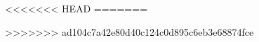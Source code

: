 \documentclass[laboratorio]{guia}
\begin{document}
<<<<<<< HEAD
=======




>>>>>>> ad104c7a42e80d40c124c0d895c6eb3e68874fce








        

\nocite{Alonso1998,Jenkins2001,Hecht1986}


\end{document}

